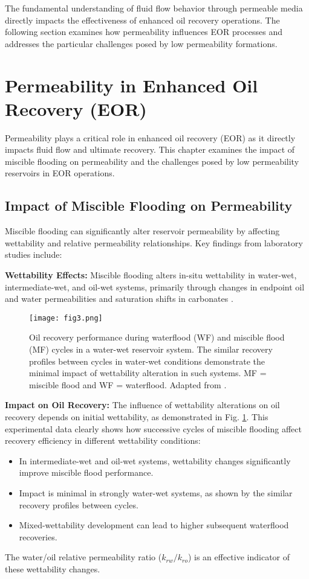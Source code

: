 \documentclass[journal]{IEEEtran}
\begin{document}
The fundamental understanding of fluid flow behavior through permeable media directly impacts the effectiveness of enhanced oil recovery operations. The following section examines how permeability influences EOR processes and addresses the particular challenges posed by low permeability formations.


\section{Permeability in Enhanced Oil Recovery (EOR)}
Permeability plays a critical role in enhanced oil recovery (EOR) as it directly impacts fluid flow and ultimate recovery. This chapter examines the impact of miscible flooding on permeability and the challenges posed by low permeability reservoirs in EOR operations.

\subsection{Impact of Miscible Flooding on Permeability}
Miscible flooding can significantly alter reservoir permeability by affecting wettability and relative permeability relationships. Key findings from laboratory studies include:

\textbf{Wettability Effects:} Miscible flooding alters in-situ wettability in water-wet, intermediate-wet, and oil-wet systems, primarily through changes in endpoint oil and water permeabilities and saturation shifts in carbonates \parencite{rao_impact_1992}.

\begin{figure}[t]
    \centering
    \texttt{[image: fig3.png]}
    \caption{Oil recovery performance during waterflood (WF) and miscible flood (MF) cycles in a water-wet reservoir system. The similar recovery profiles between cycles in water-wet conditions demonstrate the minimal impact of wettability alteration in such systems. MF = miscible flood and WF = waterflood. Adapted from \textcite{rao_impact_1992}.}
    \label{fig:miscible_recovery}
    \end{figure}

\textbf{Impact on Oil Recovery:} The influence of wettability alterations on oil recovery depends on initial wettability, as demonstrated in Fig. \ref{fig:miscible_recovery}. This experimental data clearly shows how successive cycles of miscible flooding affect recovery efficiency in different wettability conditions:
\begin{itemize}
    \item In intermediate-wet and oil-wet systems, wettability changes significantly improve miscible flood performance.
    \item Impact is minimal in strongly water-wet systems, as shown by the similar recovery profiles between cycles.
    \item Mixed-wettability development can lead to higher subsequent waterflood recoveries.
\end{itemize}
The water/oil relative permeability ratio ($k_{rw}/k_{ro}$) is an effective indicator of these wettability changes.
\end{document}
